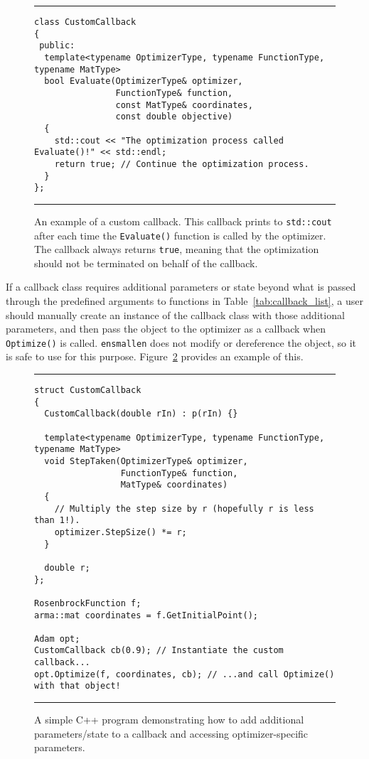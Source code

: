 \begin{figure}[H]
\centering
\hrule
\vspace{1ex}
\begin{verbatim}
class CustomCallback
{
 public:
  template<typename OptimizerType, typename FunctionType, typename MatType>
  bool Evaluate(OptimizerType& optimizer,
                FunctionType& function,
                const MatType& coordinates,
                const double objective)
  {
    std::cout << "The optimization process called Evaluate()!" << std::endl;
    return true; // Continue the optimization process.
  }
};
\end{verbatim}
\hrule
\vspace*{-0.5em}
\caption
  {
  An example of a custom callback.  This callback prints to {\tt std::cout}
after each time the {\tt Evaluate()} function is called by the optimizer.  The
callback always returns {\tt true}, meaning that the optimization should not be
terminated on behalf of the callback.
  }
\label{fig:example_prog_callbacks_2}
\end{figure}

If a callback class requires additional parameters or state beyond what is
passed through the predefined arguments to functions in
Table~\ref{tab:callback_list}, a user should manually create an instance of the
callback class with those additional parameters, and then pass the object to the
optimizer as a callback when {\tt Optimize()} is called.  {\tt ensmallen} does
not modify or dereference the object, so it is safe to use for this purpose.
Figure~\ref{fig:example_prog_callbacks_parameter} provides an example of this.

\begin{figure}[t!]
\centering
\hrule
\vspace{1ex}
\begin{verbatim}
struct CustomCallback
{
  CustomCallback(double rIn) : p(rIn) {}

  template<typename OptimizerType, typename FunctionType, typename MatType>
  void StepTaken(OptimizerType& optimizer,
                 FunctionType& function,
                 MatType& coordinates)
  {
    // Multiply the step size by r (hopefully r is less than 1!).
    optimizer.StepSize() *= r;
  }

  double r;
};

RosenbrockFunction f;
arma::mat coordinates = f.GetInitialPoint();

Adam opt;
CustomCallback cb(0.9); // Instantiate the custom callback...
opt.Optimize(f, coordinates, cb); // ...and call Optimize() with that object!
\end{verbatim}
\hrule
\vspace*{-0.5em}
\caption
  {
  A simple C++ program demonstrating how to add additional parameters/state to a
callback and accessing optimizer-specific parameters.
  }
\label{fig:example_prog_callbacks_parameter}
\end{figure}

